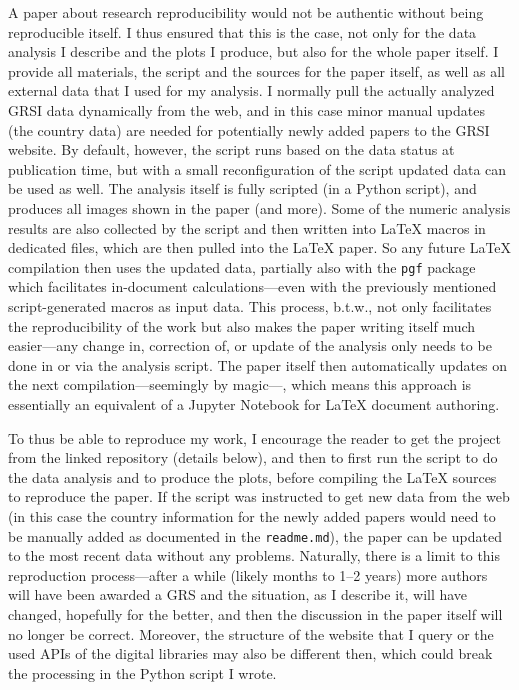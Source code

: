 \documentclass[conference,svgnames]{vgtc}                     %
\begin{document}
A paper about research reproducibility would not be authentic without being reproducible itself. I thus ensured that this is the case, not only for the data analysis I describe and the plots I produce, but also for the whole paper itself. I provide all materials, the script and the sources for the paper itself, as well as all external data that I used for my analysis. I normally pull the actually analyzed GRSI data dynamically from the web, and in this case minor manual updates (the country data) are needed for potentially newly added papers to the GRSI website. By default, however, the script runs based on the data status at publication time, but with a small reconfiguration of the script updated data can be used as well. The analysis itself is fully scripted (in a Python script), and produces all images shown in the paper (and more). Some of the numeric analysis results are also collected by the script and then written into \LaTeX{} macros in dedicated files, which are then pulled into the \LaTeX{} paper. So any future \LaTeX{} compilation then uses the updated data, partially also with the \texttt{pgf} package which facilitates in-document calculations---even with the previously mentioned script-generated macros as input data. This process, b.t.w., not only facilitates the reproducibility of the work but also makes the paper writing itself much easier---any change in, correction of, or update of the analysis only needs to be done in or via the analysis script. The paper itself then automatically updates on the next compilation---seemingly by magic---, which means this approach is essentially an equivalent of a Jupyter Notebook for \LaTeX{} document authoring.

To thus be able to reproduce my work, I encourage the reader to get the project from the linked repository (details below), and then to first run the script to do the data analysis and to produce the plots, before compiling the \LaTeX{} sources to reproduce the paper. If the script was instructed to get new data from the web (in this case the country information for the newly added papers would need to be manually added as documented in the \texttt{readme.md}), the paper can be updated to the most recent data without any problems. Naturally, there is a limit to this reproduction process---after a while (likely months to 1--2 years) more authors will have been awarded a GRS and the situation, as I describe it, will have changed, hopefully for the better, and then the discussion in the paper itself will no longer be correct. Moreover, the structure of the website that I query or the used APIs of the digital libraries may also be different then, which could break the processing in the Python script I wrote.
\end{document}
